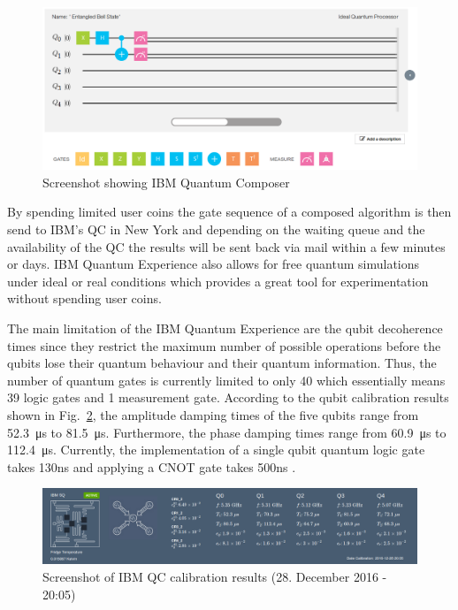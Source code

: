 \begin{figure}[H]
      \centering
       \includegraphics[scale=0.36]{img/ibmcomposer.png}
       \caption{\label{fig:composer} Screenshot showing IBM Quantum Composer}
\end{figure}

By spending limited user coins the gate sequence of a composed algorithm is then send to IBM's QC in New York and depending on the waiting queue and the availability of the QC the results will be sent back via mail within a few minutes or days. IBM Quantum Experience also allows for free quantum simulations under ideal or real conditions which provides a great tool for experimentation without spending user coins.

The main limitation of the IBM Quantum Experience are the qubit decoherence times since they restrict the maximum number of possible operations before the qubits lose their quantum behaviour and their quantum information. Thus, the number of quantum gates is currently limited to only 40 which essentially means 39 logic gates and 1 measurement gate. According to the qubit calibration results shown in Fig.~\ref{fig:calibration}, the amplitude damping times of the five qubits range from \SI{52.3}{\micro\second} to \SI{81.5}{\micro\second}. Furthermore, the phase damping times range from \SI{60.9}{\micro\second} to \SI{112.4}{\micro\second}. Currently, the implementation of a single qubit quantum logic gate takes 130ns and applying a CNOT gate takes 500ns \cite{ibmgatetimes}.

\begin{figure}[H]
      \centering
       \includegraphics[scale=0.33]{img/ibmcalibration.png}
       \caption{\label{fig:calibration} Screenshot of IBM QC calibration results (28. December 2016 - 20:05)}
\end{figure}
